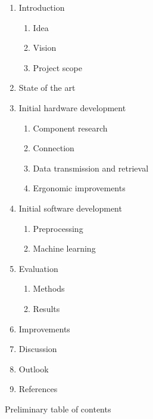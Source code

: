 \begin{figure}[htb]
    \centering
    \begin{minipage}{0.8\textwidth}
        \renewcommand{\labelenumii}{\theenumii}
        \renewcommand{\theenumii}{\theenumi.\arabic{enumii}.}

        \begin{enumerate}[noitemsep]
            \item Introduction
                \begin{enumerate}[noitemsep]
                    \item Idea
                    \item Vision
                    \item Project scope
                \end{enumerate}

            \item State of the art

            \item Initial hardware development
                \begin{enumerate}[noitemsep]
                    \item Component research
                    \item Connection
                    \item Data transmission and retrieval
                    \item Ergonomic improvements
                \end{enumerate}

            \item Initial software development
                \begin{enumerate}[noitemsep]
                    \item Preprocessing
                    \item Machine learning
                \end{enumerate}

            \item Evaluation 
                \begin{enumerate}[noitemsep]
                    \item Methods
                    \item Results
                \end{enumerate}

            \item Improvements
            \item Discussion
            \item Outlook
            \item References
        \end{enumerate}
    \end{minipage}
    \caption{Preliminary table of contents}
    \label{fig:toc}
\end{figure}
